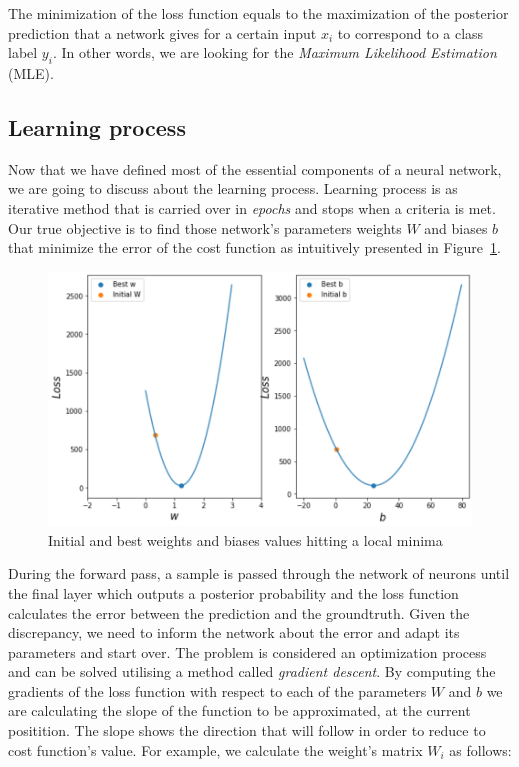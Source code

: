 The minimization of the loss function equals to the maximization of the posterior prediction that a network gives for a certain input $x_i$ to correspond to a class label $y_i$. In other words, we are looking for the \textit{Maximum Likelihood Estimation} (MLE).

\subsection{Learning process}

Now that we have defined most of the essential components of a neural network, we are going to discuss about the learning process.
Learning process is as iterative method that is carried over in \textit{epochs} and stops when a criteria is met. Our true objective is to find those network's parameters weights $W$ and biases $b$ that minimize the error of the cost function as intuitively presented in Figure~\ref{c3:wnb}.

\begin{figure}[h!]
    \centering  
    \includegraphics[width=.8\textwidth]{figures/chap3/ml/wnb}
    \caption{Initial and best weights and biases values hitting a local minima}
    \label{c3:wnb}
\end{figure}


During the forward pass, a sample is passed through the network of neurons until the final layer which outputs a posterior probability and the loss function calculates the error between the prediction and the groundtruth. Given the discrepancy, we need to inform the network about the error and adapt its parameters and start over. The problem is considered an optimization process and can be solved utilising a method called \textit{gradient descent}. By computing the gradients of the loss function with respect to each of the parameters $W$ and $b$ we are calculating the slope of the function to be approximated, at the current positition. The slope shows the direction that will follow in order to reduce to cost function's value.
For example, we calculate the weight's matrix $W_i$ as follows:

